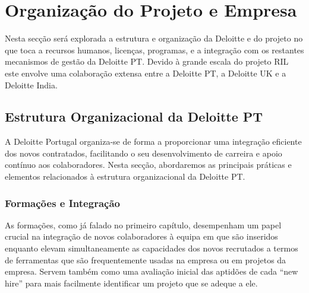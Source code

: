 \section{Organização do Projeto e Empresa}\label{sec:org-projeto-empresa}

    Nesta secção será explorada a estrutura e organização da Deloitte e do projeto no que toca a recursos humanos, licenças, programas, e a integração com os restantes mecanismos de gestão da Deloitte PT. Devido à grande escala do projeto RIL este envolve uma colaboração extensa entre a Deloitte PT, a Deloitte UK e a Deloitte India. 

    \subsection{Estrutura Organizacional da Deloitte PT}

        \begin{comment}
            
        Falar das formações, como são usadas para pôr os novos contratados a par com o resto da equipa e como forma de ver em que projeto é que ficariam melhor

        explicar a hierarquia de intern, brightstart, para junior developer, para developer, para team leader, para etc. deloitte

        explicar os buddys

        explicar os carrear coaches, como podem ser mudados todos os anos e como temos reuniões mensais com eles sobre perguntas de carreira na deloitte ou outros temas que possamos não nos sentir confortaveis a falar com o nosso team leader
        \end{comment}
        
        A Deloitte Portugal organiza-se de forma a proporcionar uma integração eficiente dos novos contratados, facilitando o seu desenvolvimento de carreira e apoio contínuo aos colaboradores. Nesta secção, abordaremos as principais práticas e elementos relacionados à estrutura organizacional da Deloitte PT.
        
        \subsubsection{Formações e Integração}\label{formacoes_e_integracao}
        
            As formações, como já falado no primeiro capítulo, desempenham um papel crucial na integração de novos colaboradores à equipa em que são inseridos enquanto elevam simultaneamente  as capacidades dos novos recrutados a termos de ferramentas que são frequentemente usadas na empresa ou em projetos da empresa. Servem também como uma avaliação inicial das aptidões de cada ``new hire'' para mais facilmente identificar um projeto que se adeque a ele.
        

